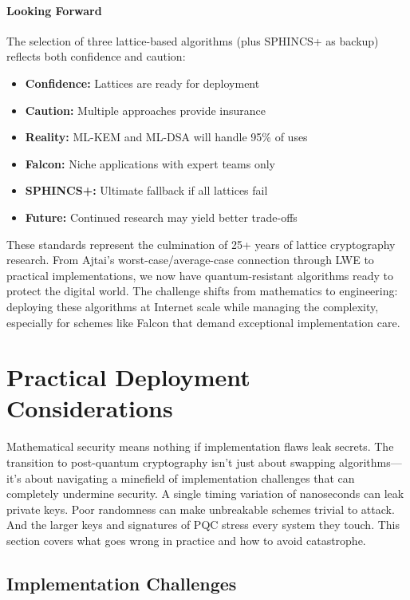 \documentclass[11pt,a4paper]{article}
\begin{document}
\paragraph{Looking Forward}

The selection of three lattice-based algorithms (plus SPHINCS+ as backup) reflects both confidence and caution:
\begin{itemize}
    \item \textbf{Confidence:} Lattices are ready for deployment
    \item \textbf{Caution:} Multiple approaches provide insurance
    \item \textbf{Reality:} ML-KEM and ML-DSA will handle 95\% of uses
    \item \textbf{Falcon:} Niche applications with expert teams only
    \item \textbf{SPHINCS+:} Ultimate fallback if all lattices fail
    \item \textbf{Future:} Continued research may yield better trade-offs
\end{itemize}

These standards represent the culmination of 25+ years of lattice cryptography research. From Ajtai's worst-case/average-case connection through LWE to practical implementations, we now have quantum-resistant algorithms ready to protect the digital world. The challenge shifts from mathematics to engineering: deploying these algorithms at Internet scale while managing the complexity, especially for schemes like Falcon that demand exceptional implementation care.


\section{Practical Deployment Considerations}
\label{sec:deployment}

Mathematical security means nothing if implementation flaws leak secrets. The transition to post-quantum cryptography isn't just about swapping algorithms—it's about navigating a minefield of implementation challenges that can completely undermine security. A single timing variation of nanoseconds can leak private keys. Poor randomness can make unbreakable schemes trivial to attack. And the larger keys and signatures of PQC stress every system they touch. This section covers what goes wrong in practice and how to avoid catastrophe.

\subsection{Implementation Challenges}
\label{sec:implementation}
\end{document}
